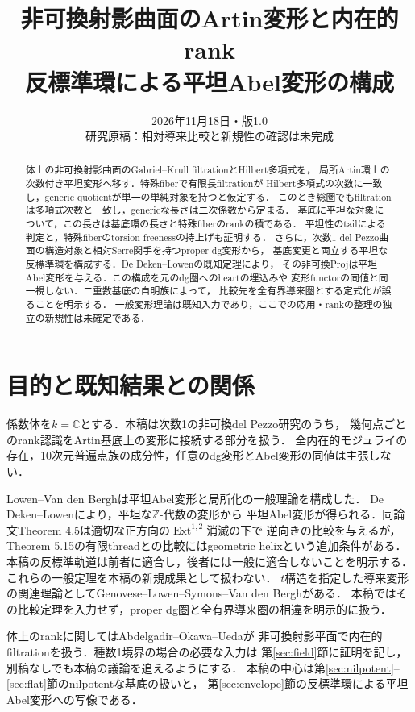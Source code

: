 \documentclass[11pt,a4paper]{ltjsarticle}
\title{非可換射影曲面のArtin変形と内在的rank\\反標準環による平坦Abel変形の構成}
\author{}
\date{2026年11月18日・版1.0\\研究原稿：相対導来比較と新規性の確認は未完成}
\theoremstyle{definition}
\newcommand{\Ext}{\operatorname{Ext}}
\begin{document}
\maketitle
\begin{abstract}
体上の非可換射影曲面のGabriel--Krull filtrationとHilbert多項式を，
局所Artin環上の次数付き平坦変形へ移す．特殊fiberで有限長filtrationが
Hilbert多項式の次数に一致し，generic quotientが単一の単純対象を持つと仮定する．
このとき総圏でもfiltrationは多項式次数と一致し，genericな長さは二次係数から定まる．
基底に平坦な対象について，この長さは基底環の長さと特殊fiberのrankの積である．
平坦性のtailによる判定と，特殊fiberのtorsion-freenessの持上げも証明する．
さらに，次数1 del Pezzo曲面の構造対象と相対Serre関手を持つproper dg変形から，
基底変更と両立する平坦な反標準環を構成する．De Deken--Lowenの既知定理により，
その非可換Projは平坦Abel変形を与える．この構成を元のdg圏へのheartの埋込みや
変形functorの同値と同一視しない．二重数基底の自明族によって，
比較先を全有界導来圏とする定式化が誤ることを明示する．
一般変形理論は既知入力であり，ここでの応用・rankの整理の独立の新規性は未確定である．
\end{abstract}

\section{目的と既知結果との関係}\label{sec:intro}
係数体を$k=\mathbb C$とする．本稿は次数1の非可換del Pezzo研究のうち，
幾何点ごとのrank認識をArtin基底上の変形に接続する部分を扱う．
全内在的モジュライの存在，10次元普遍点族の成分性，任意のdg変形とAbel変形の同値は主張しない．

Lowen--Van den Bergh\cite{LVdB}は平坦Abel変形と局所化の一般理論を構成した．
De Deken--Lowen\cite[Proposition 4.4]{DDL}により，平坦な$\mathbb Z$-代数の変形から
平坦Abel変形が得られる．同論文Theorem 4.5は適切な正方向の$\Ext^{1,2}$消滅の下で
逆向きの比較を与えるが，Theorem 5.15の有限threadとの比較にはgeometric helixという追加条件がある．
本稿の反標準軌道は前者に適合し，後者には一般に適合しないことを明示する．
これらの一般定理を本稿の新規成果として扱わない．
$t$構造を指定した導来変形の関連理論としてGenovese--Lowen--Symons--Van den Bergh\cite{GLSV}がある．
本稿ではその比較定理を入力せず，proper dg圏と全有界導来圏の相違を明示的に扱う．

体上のrankに関してはAbdelgadir--Okawa--Ueda\cite[Appendix A]{AOU}が
非可換射影平面で内在的filtrationを扱う．種数1境界の場合の必要な入力は
第\ref{sec:field}節に証明を記し，別稿\cite{RankPaper}なしでも本稿の議論を追えるようにする．
本稿の中心は第\ref{sec:nilpotent}--\ref{sec:flat}節のnilpotentな基底の扱いと，
第\ref{sec:envelope}節の反標準環による平坦Abel変形への写像である．
\end{document}
